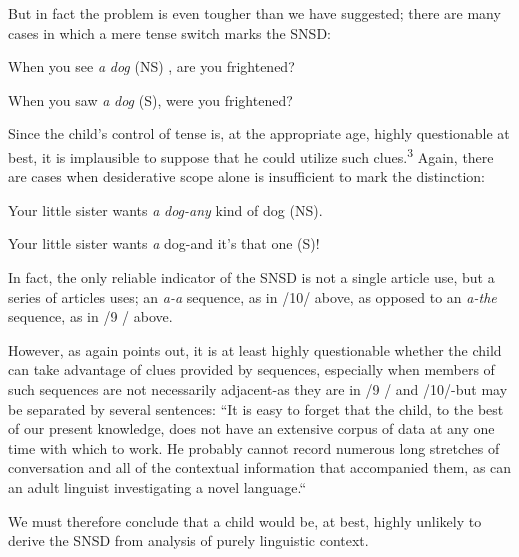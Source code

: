 But in fact the problem is even tougher than we have suggested; there are many cases in which a mere tense switch marks the SNSD:

\ea\label{ex:11}
 When you see \textit{a} \textit{dog} (NS) , are you frightened? 
\z

\ea\label{ex:12}
 When you saw \textit{a} \textit{dog} (S), were you frightened? 
\z

Since the child's control of tense is, at the appropriate age, highly questionable at best, it is implausible to suppose that he could utilize such clues.\textsuperscript{3} Again, there are cases when desiderative scope alone is insufficient to mark the distinction:

\ea\label{ex:13}
 Your little sister wants \textit{a} \textit{dog-any} kind of dog (NS). 
\z

\ea\label{ex:14}
 Your little sister wants \textit{a} dog-and it's that one (S)! 
\z

% 

In fact, the only reliable indicator of the SNSD is not a single article use, but a series of articles uses; an \textit{a-a }sequence, as in /10/ above, as opposed to an \textit{a-the} sequence, as in /9 / above.

However, as \citet[95]{Maratsos1976} again points out, it is at least highly questionable whether the child can take advantage of clues provided by sequences, especially when members of such sequences are not necessarily adjacent-as they are in /9 / and /10/-but may be separated by several sentences: ``It is easy to forget that the child, to the best of our present knowledge, does not have an extensive corpus of data at any one time with which to work. He probably cannot record numerous long stretches of conversation and all of the con\-textual information that accompanied them, as can an adult linguist investigating a novel language.``

We must therefore conclude that a child would be, at best, highly unlikely to derive the SNSD from analysis of purely linguistic context.

